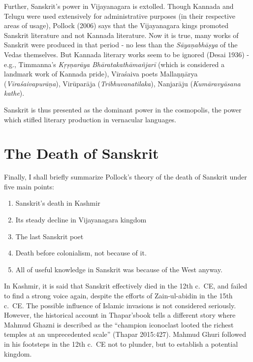 Further, Sanskrit’s power in Vijayanagara is extolled. Though Kannada and Telugu were used extensively for administrative purposes (in their respective areas of usage), Pollock (2006) says that the Vijayanagara kings promoted Sanskrit literature and not Kannada literature. Now it is true, many works of Sanskrit were produced in that period - no less than the {\sl Sāyaṇabhāṣya} of the Vedas themselves. But Kannada literary works seem to be ignored (Desai 1936) - e.g., Timmanna’s {\sl Kṛṣṇarāya Bhāratakathāmañjarī} (which is considered a landmark work of Kannada pride), Vīraśaiva poets Mallaṇṇārya ({\sl Vīraśaivapurāṇa}), Virūparāja ({\sl Tribhuvanatilaka}), Nanjarāju ({\sl Kumāravyāsana kathe}).

Sanskrit is thus presented as the dominant power in the cosmopolis, the power which stifled literary production in vernacular languages.
\vskip -10pt

\section{The Death of Sanskrit}
\vskip -3pt

Finally, I shall briefly summarize Pollock’s theory of the death of Sanskrit under five main points:

\begin{enumerate}
\item Sanskrit’s death in Kashmir
\item Its steady decline in Vijayanagara kingdom
\item The last Sanskrit poet
\item Death before colonialism, not because of it. 
\item All of useful knowledge in Sanskrit was because of the West anyway.
\end{enumerate}

In Kashmir, it is said that Sanskrit effectively died in the 12th c.\ CE, and failed to find a strong voice again, despite the efforts of Zain-ul-abidin in the 15th c.\ CE. The possible influence of Islamic invasions is not considered seriously. However, the historical account in Thapar’sbook tells a different story where Mahmud Ghazni is described as the “champion iconoclast looted the richest temples at an unprecedented scale” (Thapar 2015:427). Mahmud Ghuri followed in his footsteps in the 12th c.\ CE not to plunder, but to establish a potential kingdom.
\vskip 1.5pt


